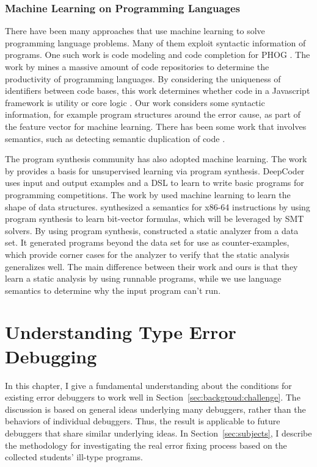 \documentclass[12pt]{report}	%
\begin{document}
\subsection{Machine Learning on Programming Languages}

There have been many approaches that use machine learning to solve
programming language problems. Many of them exploit syntactic
information of programs. One such work is code modeling and code completion
for PHOG \cite{Bielik2016:PPM}.
The work by \cite{Allamanis:2013:MSC:2487085.2487127}
mines a massive amount of code
repositories to determine the productivity of programming languages.
By considering the
uniqueness of identifiers between code bases, this work
determines whether code in a Javascript framework is
utility or core logic \cite{Allamanis:2013:MSC:2487085.2487127}.
Our work considers some syntactic information, for example
program structures around the error cause, as part of the feature
vector for machine learning.
%
There has been
some work that involves semantics, such as detecting semantic
duplication of code \cite{Sheneamer:2016:SCD}.

The program synthesis community has also adopted machine learning.
The work by \cite{Ellis:2015:ULP:2969239.2969348} provides a basis for
unsupervised learning via program synthesis.
DeepCoder \cite{DBLP:journals/corr/BalogGBNT16} uses input and output
examples and a DSL to learn to write
basic programs for programming competitions.
The work by \cite{Zhu16:ALSS} used machine learning to learn
the shape of data structures. \cite{Heule:2016:SSA:2980983.2908121}
synthesized a semantics for x86-64 instructions by using program
synthesis to learn bit-vector formulas, which will be leveraged
by SMT solvers.
%
By using program synthesis, \cite{Bielik16:LSAD} constructed a static
analyzer from a data set.
It generated programs beyond the data set for use as counter-examples,
which provide corner cases for the analyzer to verify that the
static analysis generalizes well.
The main difference between their work
and ours is that they learn a static analysis by
using runnable programs, while we use language semantics
to determine why the input program can't run.



\chapter{Understanding Type Error Debugging}
\label{sec:background}

In this chapter, I give a fundamental understanding about the conditions for existing error debuggers to work well in Section~\ref{sec:backgroud:challenge}.
The discussion is based on general ideas underlying many debuggers, rather than the behaviors of individual debuggers.
Thus, the result is applicable to future debuggers that share similar underlying ideas.
%
In Section~\ref{sec:subjects}, I describe the methodology for investigating the real error fixing process based on the collected students' ill-type programs.
\end{document}
